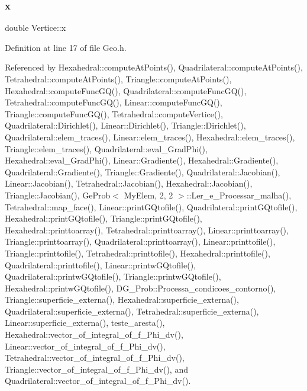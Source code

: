 \subsubsection{\texorpdfstring{x}{x}}
{\footnotesize\ttfamily double Vertice\+::x}



Definition at line 17 of file Geo.\+h.



Referenced by Hexahedral\+::compute\+At\+Points(), Quadrilateral\+::compute\+At\+Points(), Tetrahedral\+::compute\+At\+Points(), Triangle\+::compute\+At\+Points(), Hexahedral\+::compute\+Func\+G\+Q(), Quadrilateral\+::compute\+Func\+G\+Q(), Tetrahedral\+::compute\+Func\+G\+Q(), Linear\+::compute\+Func\+G\+Q(), Triangle\+::compute\+Func\+G\+Q(), Tetrahedral\+::compute\+Vertice(), Quadrilateral\+::\+Dirichlet(), Linear\+::\+Dirichlet(), Triangle\+::\+Dirichlet(), Quadrilateral\+::elem\+\_\+traces(), Linear\+::elem\+\_\+traces(), Hexahedral\+::elem\+\_\+traces(), Triangle\+::elem\+\_\+traces(), Quadrilateral\+::eval\+\_\+\+Grad\+Phi(), Hexahedral\+::eval\+\_\+\+Grad\+Phi(), Linear\+::\+Gradiente(), Hexahedral\+::\+Gradiente(), Quadrilateral\+::\+Gradiente(), Triangle\+::\+Gradiente(), Quadrilateral\+::\+Jacobian(), Linear\+::\+Jacobian(), Tetrahedral\+::\+Jacobian(), Hexahedral\+::\+Jacobian(), Triangle\+::\+Jacobian(), Ge\+Prob$<$ My\+Elem, 2, 2 $>$\+::\+Ler\+\_\+e\+\_\+\+Processar\+\_\+malha(), Tetrahedral\+::map\+\_\+face(), Linear\+::print\+G\+Qtofile(), Quadrilateral\+::print\+G\+Qtofile(), Hexahedral\+::print\+G\+Qtofile(), Triangle\+::print\+G\+Qtofile(), Hexahedral\+::printtoarray(), Tetrahedral\+::printtoarray(), Linear\+::printtoarray(), Triangle\+::printtoarray(), Quadrilateral\+::printtoarray(), Linear\+::printtofile(), Triangle\+::printtofile(), Tetrahedral\+::printtofile(), Hexahedral\+::printtofile(), Quadrilateral\+::printtofile(), Linear\+::printw\+G\+Qtofile(), Quadrilateral\+::printw\+G\+Qtofile(), Triangle\+::printw\+G\+Qtofile(), Hexahedral\+::printw\+G\+Qtofile(), D\+G\+\_\+\+Prob\+::\+Processa\+\_\+condicoes\+\_\+contorno(), Triangle\+::superficie\+\_\+externa(), Hexahedral\+::superficie\+\_\+externa(), Quadrilateral\+::superficie\+\_\+externa(), Tetrahedral\+::superficie\+\_\+externa(), Linear\+::superficie\+\_\+externa(), teste\+\_\+aresta(), Hexahedral\+::vector\+\_\+of\+\_\+integral\+\_\+of\+\_\+f\+\_\+\+Phi\+\_\+dv(), Linear\+::vector\+\_\+of\+\_\+integral\+\_\+of\+\_\+f\+\_\+\+Phi\+\_\+dv(), Tetrahedral\+::vector\+\_\+of\+\_\+integral\+\_\+of\+\_\+f\+\_\+\+Phi\+\_\+dv(), Triangle\+::vector\+\_\+of\+\_\+integral\+\_\+of\+\_\+f\+\_\+\+Phi\+\_\+dv(), and Quadrilateral\+::vector\+\_\+of\+\_\+integral\+\_\+of\+\_\+f\+\_\+\+Phi\+\_\+dv().

